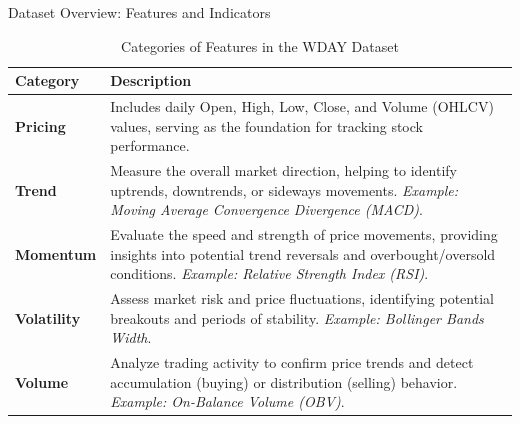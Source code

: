 \begin{frame}[label=datastructure,shrink]{Dataset Overview: Features and Indicators}
\begin{table}
\centering
\caption{Categories of Features in the WDAY Dataset}
\label{tab:datasetstructure}
\renewcommand{\arraystretch}{1.7} 
\begin{tabular}{p{2cm}p{12.5cm}}
\hline
\textbf{Category} & \textbf{Description} \\
\hline\hline
\textbf{Pricing} & Includes daily Open, High, Low, Close, and Volume (OHLCV) 
values, serving as the \alert{foundation for tracking stock performance}. \\
\textbf{Trend} & Measure the overall market direction, 
\alert{helping to identify uptrends, downtrends}, or sideways movements. \textit{Example: Moving Average Convergence Divergence (MACD)}. \\
\textbf{Momentum} & Evaluate the \alert{speed and strength of price movements},
providing insights into potential trend reversals and overbought/oversold 
conditions. \textit{Example: Relative Strength Index (RSI)}. \\
\textbf{Volatility} & Assess market risk and \alert{price fluctuations}, identifying 
potential breakouts and periods of stability. {\textit{Example: Bollinger Bands Width}.} \\
\textbf{Volume} & Analyze trading activity to confirm price trends and \alert{detect accumulation (buying) or distribution (selling) behavior}. \textit{Example: On-Balance Volume (OBV)}. \\
\hline
\end{tabular}
\end{table}

\end{frame}

